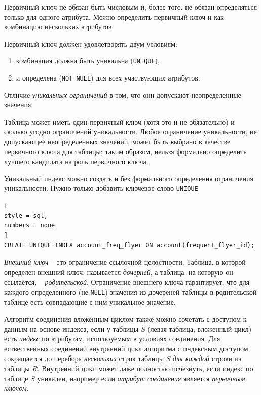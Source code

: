 \documentclass[%
	11pt,
	a4paper,
	utf8,
		]{article}
\begin{document}

Первичный ключ не обязан быть числовым и, более того, не обязан определяться только для одного атрибута. Можно определить первичный ключ и как комбинацию нескольких атрибутов.

Первичный ключ должен удовлетворять двум условиям:
\begin{enumerate}
	\item комбинация должна быть уникальна (\verb|UNIQUE|),
	
	\item и определена (\verb|NOT NULL|) для всех участвующих атрибутов.
\end{enumerate}

Отличие \emph{уникальных ограничений} в том, что они допускают неопределенные значения.

Таблица может иметь один первичный ключ (хотя это и не обязательно) и сколько угодно ограничений уникальности. Любое ограничение уникальности, не допускающее неопределенных значений, может быть выбрано в качестве первичного ключа для таблицы; таким образом, нельзя формально определить лучшего кандидата на роль первичного ключа.

Уникальный индекс можно создать и без формального определения ограничения уникальности. Нужно только добавить ключевое слово \verb|UNIQUE|
\begin{lstlisting}[
style = sql,
numbers = none
]
CREATE UNIQUE INDEX account_freq_flyer ON account(frequent_flyer_id);
\end{lstlisting}

\emph{Внешний ключ} -- это ограничение ссылочной целостности. Таблица, в которой определен внешний ключ, называется \emph{дочерней}, а таблица, на которую он ссылается, -- \emph{родительской}. Ограничение внешнего ключа гарантирует, что для каждого определенного (не \verb|NULL|) значения из дочереней таблицы в родительской таблице есть совпадающие с ним уникальное значение.

Алгоритм соединения вложенным циклом также можно сочетать с доступом к данным на основе индекса, если у таблицы $ S $ (левая таблица, вложенный цикл) есть \emph{индекс} по атрибутам, используемым в условиях соединения. Для ествественных соединений внутренний цикл алгоритма с индексным доступом сокращается до перебора \underline{\itshape нескольких} строк таблицы $ S $ \underline{\itshape для каждой} строки из таблицы $ R $. Внутренний цикл может даже полностью исчезнуть, если индекс по таблице $ S $ уникален, например если \emph{атрибут соединения} является \emph{первичным ключом}.
\end{document}
